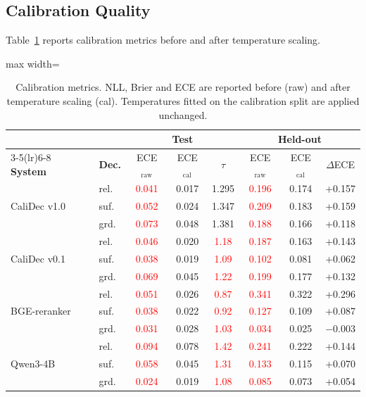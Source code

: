 \documentclass[twocolumn]{ICCKjournal}
\newcommand{\ph}[1]{\textcolor{red}{#1}}
\begin{document}
\subsection{Calibration Quality}
\label{sec:calresults}
Table~\ref{tab:calibration} reports calibration metrics before and after temperature scaling.

\begin{table}[H]
\caption{Calibration metrics. NLL, Brier and ECE are reported before (raw) and after temperature scaling (cal). Temperatures fitted on the calibration split are applied unchanged.}
\label{tab:calibration}
\centering
\small
\begin{adjustbox}{max width=\linewidth}
\begin{tabular}{llcccccc}
\toprule
& & \multicolumn{3}{c}{\textbf{Test}} & \multicolumn{3}{c}{\textbf{Held-out}} \\
\cmidrule(lr){3-5}\cmidrule(lr){6-8}
\textbf{System} & \textbf{Dec.} & ECE$_{\mathrm{raw}}$ & ECE$_{\mathrm{cal}}$ & $\tau$ & ECE$_{\mathrm{raw}}$ & ECE$_{\mathrm{cal}}$ & $\Delta$ECE \\
\midrule
\multirow{3}{*}{CaliDec v1.0}
 & rel. & \ph{0.041} & 0.017 & 1.295 & \ph{0.196} & 0.174 & +0.157 \\
 & suf. & \ph{0.052} & 0.024 & 1.347 & \ph{0.209} & 0.183 & +0.159 \\
 & grd. & \ph{0.073} & 0.048 & 1.381 & \ph{0.188} & 0.166 & +0.118 \\
\midrule
\multirow{3}{*}{CaliDec v0.1}
 & rel. & \ph{0.046} & 0.020 & \ph{1.18} & \ph{0.187} & 0.163 & +0.143 \\
 & suf. & \ph{0.038} & 0.019 & \ph{1.09} & \ph{0.102} & 0.081 & +0.062 \\
 & grd. & \ph{0.069} & 0.045 & \ph{1.22} & \ph{0.199} & 0.177 & +0.132 \\
\midrule
\multirow{3}{*}{BGE-reranker}
 & rel. & \ph{0.051} & 0.026 & \ph{0.87} & \ph{0.341} & 0.322 & +0.296 \\
 & suf. & \ph{0.038} & 0.022 & \ph{0.92} & \ph{0.127} & 0.109 & +0.087 \\
 & grd. & \ph{0.031} & 0.028 & \ph{1.03} & \ph{0.034} & 0.025 & $-$0.003 \\
\midrule
\multirow{3}{*}{Qwen3-4B}
 & rel. & \ph{0.094} & 0.078 & \ph{1.42} & \ph{0.241} & 0.222 & +0.144 \\
 & suf. & \ph{0.058} & 0.045 & \ph{1.31} & \ph{0.133} & 0.115 & +0.070 \\
 & grd. & \ph{0.024} & 0.019 & \ph{1.08} & \ph{0.085} & 0.073 & +0.054 \\
\bottomrule
\end{tabular}
\end{adjustbox}
\end{table}
\end{document}
